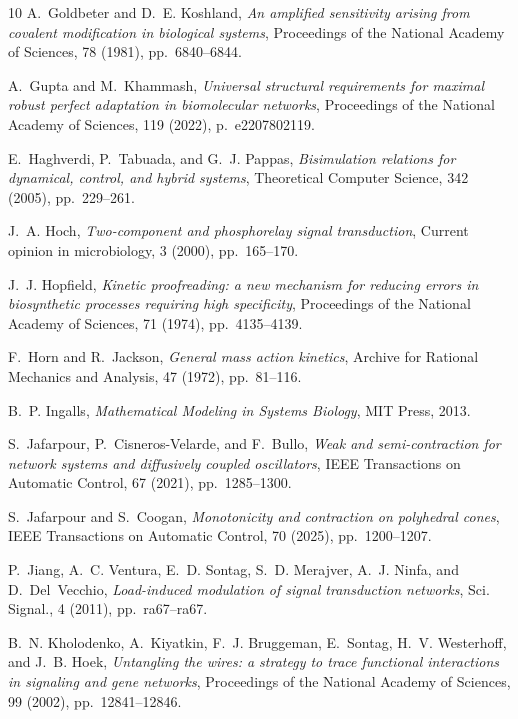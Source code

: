 \documentclass[onefignum,onetabnum]{siamonline220329}
\begin{document}
{\begin{thebibliography}{10}
	{\sc A.~Goldbeter and D.~E. Koshland}, {\em An amplified sensitivity arising
		from covalent modification in biological systems}, Proceedings of the
	National Academy of Sciences, 78 (1981), pp.~6840--6844.
	
	{\sc A.~Gupta and M.~Khammash}, {\em Universal structural requirements for
		maximal robust perfect adaptation in biomolecular networks}, Proceedings of
	the National Academy of Sciences, 119 (2022), p.~e2207802119.
	
	{\sc E.~Haghverdi, P.~Tabuada, and G.~J. Pappas}, {\em Bisimulation relations
		for dynamical, control, and hybrid systems}, Theoretical Computer Science,
	342 (2005), pp.~229--261.
	
	{\sc J.~A. Hoch}, {\em Two-component and phosphorelay signal transduction},
	Current opinion in microbiology, 3 (2000), pp.~165--170.
	
	{\sc J.~J. Hopfield}, {\em Kinetic proofreading: a new mechanism for reducing
		errors in biosynthetic processes requiring high specificity}, Proceedings of
	the National Academy of Sciences, 71 (1974), pp.~4135--4139.
	
	{\sc F.~Horn and R.~Jackson}, {\em General mass action kinetics}, Archive for
	Rational Mechanics and Analysis, 47 (1972), pp.~81--116.
	
	{\sc B.~P. Ingalls}, {\em Mathematical {M}odeling in {S}ystems {B}iology}, MIT
	Press, 2013.
	
	{\sc S.~Jafarpour, P.~Cisneros-Velarde, and F.~Bullo}, {\em Weak and
		semi-contraction for network systems and diffusively coupled oscillators},
	IEEE Transactions on Automatic Control, 67 (2021), pp.~1285--1300.
	
	{\sc S.~Jafarpour and S.~Coogan}, {\em Monotonicity and contraction on
		polyhedral cones}, IEEE Transactions on Automatic Control, 70 (2025),
	pp.~1200--1207.
	
	{\sc P.~Jiang, A.~C. Ventura, E.~D. Sontag, S.~D. Merajver, A.~J. Ninfa, and
		D.~Del~Vecchio}, {\em Load-induced modulation of signal transduction
		networks}, Sci. Signal., 4 (2011), pp.~ra67--ra67.
	
	{\sc B.~N. Kholodenko, A.~Kiyatkin, F.~J. Bruggeman, E.~Sontag, H.~V.
		Westerhoff, and J.~B. Hoek}, {\em Untangling the wires: a strategy to trace
		functional interactions in signaling and gene networks}, Proceedings of the
	National Academy of Sciences, 99 (2002), pp.~12841--12846.
	

\end{thebibliography}}
\end{document}
